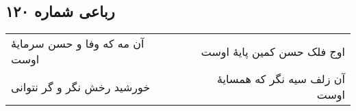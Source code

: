 \begin{center}
\section*{رباعی شماره ۱۲۰}
\label{sec:sh120}
\begin{longtable}{l p{0.5cm} r}
آن مه که وفا و حسن سرمایهٔ اوست
&&
اوج فلک حسن کمین پایهٔ اوست
\\
خورشید رخش نگر و گر نتوانی
&&
آن زلف سیه نگر که همسایهٔ اوست
\\
\end{longtable}
\end{center}
